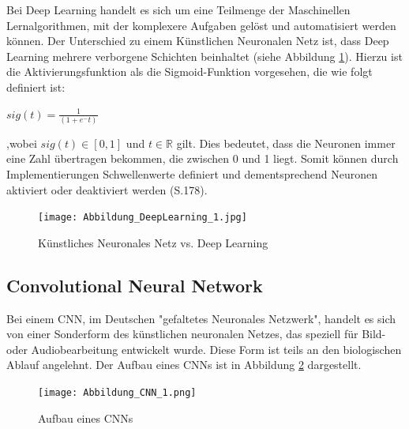 \documentclass[12pt]{scrreprt}
\begin{document}
Bei Deep Learning handelt es sich um eine Teilmenge der Maschinellen Lernalgorithmen, mit der komplexere Aufgaben gelöst und automatisiert werden können. Der Unterschied zu einem Künstlichen Neuronalen Netz ist, dass Deep Learning mehrere verborgene Schichten beinhaltet (siehe Abbildung \ref{fig:fig4}). Hierzu ist die Aktivierungsfunktion als die Sigmoid-Funktion vorgesehen, die wie folgt definiert ist:

\begin{center}
	$sig(t) = \frac{1}{(1 + e^-t)}$\\
\end{center}

,wobei $sig(t) \in [0,1]$ und $ t \in \mathbb{R}$ gilt. Dies bedeutet, dass die Neuronen immer eine Zahl übertragen bekommen, die zwischen 0 und 1 liegt. Somit können durch Implementierungen Schwellenwerte definiert und dementsprechend Neuronen aktiviert oder deaktiviert werden \cite{Frochte2021}(S.178). \\

\begin{figure}[h!]
	\centering
	\texttt{[image: Abbildung\_DeepLearning\_1.jpg]}
	\caption{Künstliches Neuronales Netz vs. Deep Learning \cite{Abbildung4}}
	\label{fig:fig4}
\end{figure}
\newpage

\subsection{Convolutional Neural Network}
Bei einem CNN, im Deutschen "gefaltetes Neuronales Netzwerk", handelt es sich von einer Sonderform des künstlichen neuronalen Netzes, das speziell für Bild- oder Audiobearbeitung entwickelt wurde. Diese Form ist teils an den biologischen Ablauf angelehnt.\cite{Luber2019} Der Aufbau eines CNNs ist in Abbildung \ref{fig:fig5} dargestellt.\\

\begin{figure}[h!]
	\centering
	\texttt{[image: Abbildung\_CNN\_1.png]}
	\caption{Aufbau eines CNNs \cite{Abbildung5}}
	\label{fig:fig5}
\end{figure}
\end{document}
